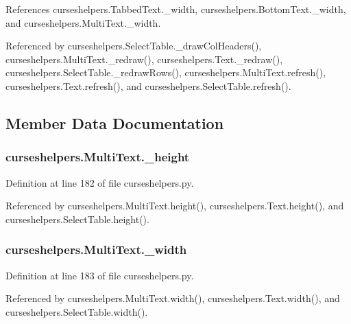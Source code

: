 References curseshelpers.\-Tabbed\-Text.\-\_\-width, curseshelpers.\-Bottom\-Text.\-\_\-width, and curseshelpers.\-Multi\-Text.\-\_\-width.



Referenced by curseshelpers.\-Select\-Table.\-\_\-draw\-Col\-Headers(), curseshelpers.\-Multi\-Text.\-\_\-redraw(), curseshelpers.\-Text.\-\_\-redraw(), curseshelpers.\-Select\-Table.\-\_\-redraw\-Rows(), curseshelpers.\-Multi\-Text.\-refresh(), curseshelpers.\-Text.\-refresh(), and curseshelpers.\-Select\-Table.\-refresh().



\subsection{Member Data Documentation}
\subsubsection[{\-\_\-height}]{\setlength{\rightskip}{0pt plus 5cm}curseshelpers.\-Multi\-Text.\-\_\-height\hspace{0.3cm}{\ttfamily [private]}}\label{classcurseshelpers_1_1MultiText_a18fbe454fd99e38f4bc8280936f0c7d4}


Definition at line 182 of file curseshelpers.\-py.



Referenced by curseshelpers.\-Multi\-Text.\-height(), curseshelpers.\-Text.\-height(), and curseshelpers.\-Select\-Table.\-height().

\subsubsection[{\-\_\-width}]{\setlength{\rightskip}{0pt plus 5cm}curseshelpers.\-Multi\-Text.\-\_\-width\hspace{0.3cm}{\ttfamily [private]}}\label{classcurseshelpers_1_1MultiText_a4b35f36184bba01caa101700d83bdd3b}


Definition at line 183 of file curseshelpers.\-py.



Referenced by curseshelpers.\-Multi\-Text.\-width(), curseshelpers.\-Text.\-width(), and curseshelpers.\-Select\-Table.\-width().

